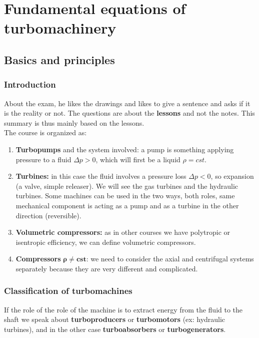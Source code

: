 
\chapter{Fundamental equations of turbomachinery}

\section{Basics and principles}
\subsection{Introduction}
	About the exam, he likes the drawings and likes to give a sentence and asks if it is the reality or not. The questions are about the \textbf{lessons} and not the notes. This summary is thus mainly based on the lessons. \\

The course is organized as: 

\begin{enumerate}
\item \textbf{Turbopumps} and the system involved: a pump is something  applying pressure to a fluid $\Delta p > 0$, which will first be a liquid $\rho = cst$.

\item \textbf{Turbines:} in this case the fluid involves a pressure loss $\Delta p < 0$, so expansion (a valve, simple releaser). We will see the gas turbines and the hydraulic turbines. Some machines can be used in the two ways, both roles, same mechanical component is acting as a pump and as a turbine in the other direction (reversible). 

\item \textbf{Volumetric compressors:} as in other courses we have polytropic or isentropic efficiency, we can define volumetric compressors. 

\item \textbf{Compressors} $\bm{\rho \neq cst}$: we need to consider the axial and centrifugal systems separately because they are very different and complicated.   
\end{enumerate}


\subsection{Classification of turbomachines}
If the role of the role of the machine is to extract energy from the fluid to the shaft we speak about \textbf{turboproducers} or \textbf{turbomotors} (ex: hydraulic turbines), and in the other case \textbf{turboabsorbers} or \textbf{turbogenerators}. 

